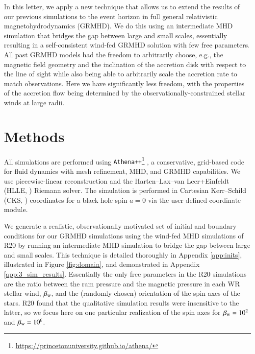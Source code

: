 \documentclass[twocolumn,twocolappendix,apjl,appendixfloats]{aastex63}
\begin{document}
In this letter, we apply a new technique that allows us to extend the results of our previous simulations to the event horizon in full general relativistic magnetohydrodynamics (GRMHD).  We do this using an intermediate MHD simulation that bridges the gap between large and small scales, essentially resulting in a self-consistent wind-fed GRMHD solution with few free parameters.   All past GRMHD models had the freedom to arbitrarily choose, e.g., the magnetic field geometry and the inclination of the accretion disk with respect to the line of sight while also being able to arbitrarily scale the accretion rate to match observations.  Here we have significantly less freedom, with the properties of the accretion flow being determined by the observationally-constrained stellar winds at large radii.  



\section{Methods}
\label{sec:methods}
All simulations are performed using {\tt Athena++}\footnote{\href{https://princetonuniversity.github.io/athena/}{https://princetonuniversity.github.io/athena/}} \citep{White2016,Athena++}, a conservative, grid-based code for fluid dynamics with mesh refinement, MHD, and GRMHD capabilities.   We use piecewise-linear reconstruction and the Harten--Lax--van Leer+Einfeldt (HLLE, \citealt{Einfeldt1988}) Riemann solver.  The simulation is performed in Cartesian Kerr--Schild (CKS, \citealt{Kerr1963}) coordinates  for a black hole spin $a=0$ via the user-defined coordinate module.  

We generate a realistic, observationally motivated set of initial and boundary conditions for our GRMHD simulations using the wind-fed MHD simulations of R20 by running an intermediate MHD simulation to bridge the gap between large and small scales.  This technique is detailed thoroughly in Appendix \ref{app:inits}, illustrated in Figure \ref{fig:domain}, and demonstrated in Appendix \ref{app:3_sim_results}.  Essentially the only free parameters in the R20 simulations are the ratio between the ram pressure and the magnetic pressure in each WR stellar wind, $\beta_{\rm w}$, and the (randomly chosen) orientation of the spin axes of the stars.   R20 found that the qualitative simulation results were insensitive to the latter, so we focus here on one particular realization of the spin axes for $\beta_{\rm w} = 10^2$ and $\beta_{\rm w} = 10^6$.  
\end{document}
